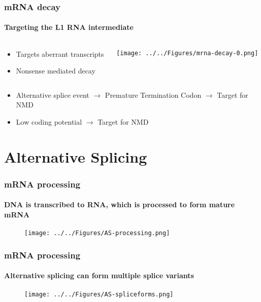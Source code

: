 \documentclass{beamer}
\begin{document}
		\begin{frame} %
			
			\frametitle{mRNA decay}
			\framesubtitle{Targeting the L1 RNA intermediate}
			\begin{columns}
				\begin{column}{0.5\linewidth}
			\begin{itemize}
				\item Targets aberrant transcripts
				\item Nonsense mediated decay 
				
				
			\end{itemize}
				\end{column}
				\begin{column}{0.5\linewidth}
					\texttt{[image: ../../Figures/mrna-decay-0.png]}
				\end{column}
			\end{columns}
			\begin{itemize}
				\item Alternative splice event $\rightarrow$ Premature Termination Codon $\rightarrow$ Target for NMD
				\item Low coding potential $\rightarrow$ Target for NMD
			\end{itemize}
		\end{frame}	
		
			\section[Alternative Splicing]{Alternative Splicing}
			
		\begin{frame} %
			\frametitle{mRNA processing}
			\framesubtitle{DNA is transcribed to RNA, which is processed to form mature mRNA}
				
				\begin{figure}
					\centering
					\texttt{[image: ../../Figures/AS-processing.png]}
				\end{figure}
			
		\end{frame}	
		
		\begin{frame} %
			\frametitle{mRNA processing}
			\framesubtitle{Alternative splicing can form multiple splice variants}
			
			\begin{figure}
				\centering
				\texttt{[image: ../../Figures/AS-spliceforms.png]}
			\end{figure}
			
		\end{frame}
\end{document}
